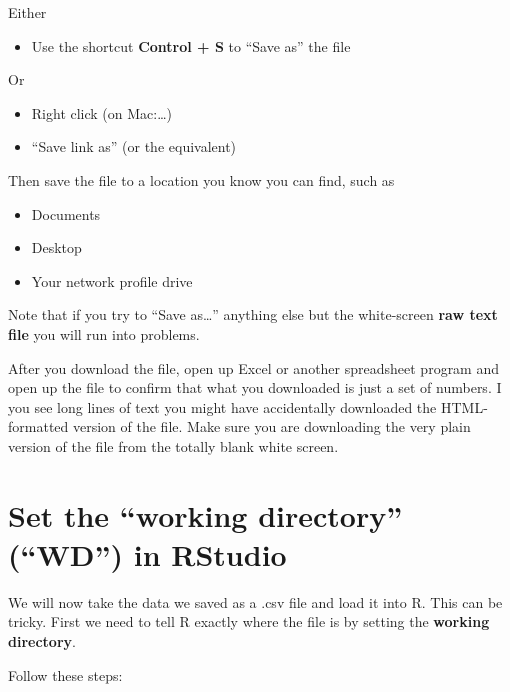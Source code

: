 \documentclass[]{book}
\providecommand{\tightlist}{%
  \setlength{\itemsep}{0pt}\setlength{\parskip}{0pt}}
\theoremstyle{definition}
\theoremstyle{definition}
\theoremstyle{definition}
\theoremstyle{remark}
\begin{document}
Either

\begin{itemize}
\tightlist
\item
  Use the shortcut \textbf{Control + S} to ``Save as'' the file
\end{itemize}

Or

\begin{itemize}
\tightlist
\item
  Right click (on Mac:\ldots{})
\item
  ``Save link as'' (or the equivalent)
\end{itemize}

Then save the file to a location you know you can find, such as

\begin{itemize}
\tightlist
\item
  Documents
\item
  Desktop
\item
  Your network profile drive
\end{itemize}

Note that if you try to ``Save as\ldots{}'' anything else but the
white-screen \textbf{raw text file} you will run into problems.

After you download the file, open up Excel or another spreadsheet
program and open up the file to confirm that what you downloaded is just
a set of numbers. I you see long lines of text you might have
accidentally downloaded the HTML-formatted version of the file. Make
sure you are downloading the very plain version of the file from the
totally blank white screen.

\section{\texorpdfstring{Set the ``working directory'' (``WD'') in
RStudio}{Set the working directory (WD) in RStudio}}\label{set-the-working-directory-wd-in-rstudio}

We will now take the data we saved as a .csv file and load it into R.
This can be tricky. First we need to tell R exactly where the file is by
setting the \textbf{working directory}.

Follow these steps:
\end{document}
